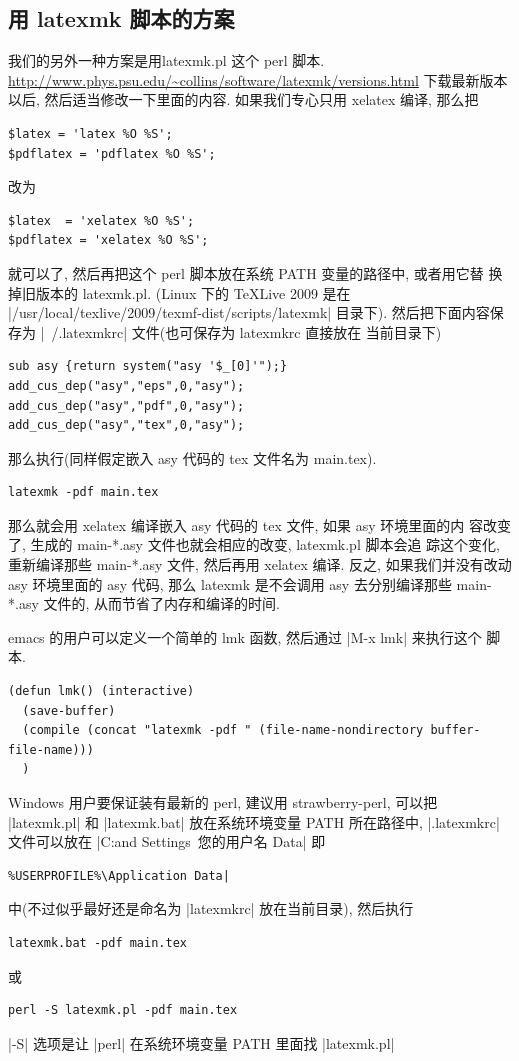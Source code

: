 \documentclass[nofonts,CJKnormalspaces]{ctexbook}
\begin{document}
\subsection{用 latexmk 脚本的方案}
我们的另外一种方案是用latexmk.pl 这个 perl 脚本.
\url{http://www.phys.psu.edu/~collins/software/latexmk/versions.html}
下载最新版本以后,
然后适当修改一下里面的内容. 如果我们专心只用 xelatex 编译, 那么把
\begin{verbatim}
$latex = 'latex %O %S';
$pdflatex = 'pdflatex %O %S';
\end{verbatim}
改为
\begin{verbatim}
$latex  = 'xelatex %O %S';
$pdflatex = 'xelatex %O %S';
\end{verbatim}
就可以了, 然后再把这个 perl 脚本放在系统 PATH 变量的路径中, 或者用它替
换掉旧版本的 latexmk.pl. (Linux 下的 TeXLive 2009 是在
|/usr/local/texlive/2009/texmf-dist/scripts/latexmk| 目录下).
然后把下面内容保存为 |~/.latexmkrc| 文件(也可保存为 latexmkrc 直接放在
当前目录下)
\begin{verbatim}
sub asy {return system("asy '$_[0]'");}
add_cus_dep("asy","eps",0,"asy");
add_cus_dep("asy","pdf",0,"asy");
add_cus_dep("asy","tex",0,"asy");
\end{verbatim}
那么执行(同样假定嵌入 asy 代码的 tex 文件名为 main.tex).
\begin{verbatim}
latexmk -pdf main.tex
\end{verbatim}
那么就会用 xelatex 编译嵌入 asy 代码的 tex 文件, 如果 asy 环境里面的内
容改变了, 生成的 main-*.asy 文件也就会相应的改变, latexmk.pl 脚本会追
踪这个变化, 重新编译那些 main-*.asy 文件, 然后再用 xelatex 编译. 反之,
如果我们并没有改动 asy 环境里面的 asy 代码, 那么 latexmk 是不会调用
asy 去分别编译那些 main-*.asy 文件的, 从而节省了内存和编译的时间.

emacs 的用户可以定义一个简单的 lmk 函数, 然后通过 |M-x lmk| 来执行这个
脚本.
\begin{verbatim}
(defun lmk() (interactive)
  (save-buffer)
  (compile (concat "latexmk -pdf " (file-name-nondirectory buffer-file-name)))
  )
\end{verbatim}

Windows 用户要保证装有最新的 perl, 建议用 strawberry-perl, 可以把
|latexmk.pl| 和 |latexmk.bat| 放在系统环境变量 PATH 所在路径中,
|.latexmkrc| 文件可以放在
|C:\Documents and Settings\ 您的用户名 \Application Data|
即
\begin{verbatim}
%USERPROFILE%\Application Data|
\end{verbatim}
 中(不过似乎最好还是命名为 |latexmkrc| 放在当前目录), 然后执行
\begin{verbatim}
latexmk.bat -pdf main.tex
\end{verbatim}
或
\begin{verbatim}
perl -S latexmk.pl -pdf main.tex
\end{verbatim}
|-S| 选项是让 |perl| 在系统环境变量 PATH 里面找 |latexmk.pl|
\end{document}

